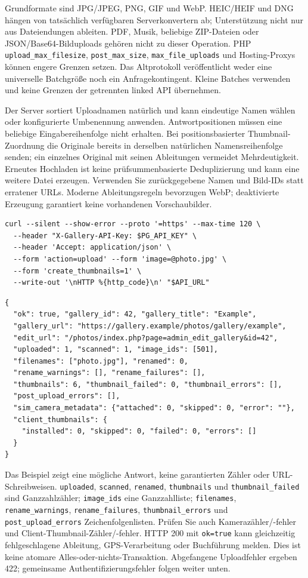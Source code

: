 \documentclass[11pt,a4paper]{article}
\newcommand{\codeword}[1]{\nolinkurl{#1}}
\begin{document}
Grundformate sind JPG/JPEG, PNG, GIF und WebP. HEIC/HEIF und DNG hängen von tatsächlich
verfügbaren Serverkonvertern ab; Unterstützung nicht nur aus Dateiendungen ableiten. PDF,
Musik, beliebige ZIP-Dateien oder JSON/Base64-Bilduploads gehören nicht zu dieser Operation.
PHP \codeword{upload_max_filesize}, \codeword{post_max_size}, \codeword{max_file_uploads}
und Hosting-Proxys können engere Grenzen setzen. Das Altprotokoll veröffentlicht weder eine
universelle Batchgröße noch ein Anfragekontingent. Kleine Batches verwenden und keine
Grenzen der getrennten linked API übernehmen.

Der Server sortiert Uploadnamen natürlich und kann eindeutige Namen wählen oder
konfigurierte Umbenennung anwenden. Antwortpositionen müssen eine beliebige
Eingabereihenfolge nicht erhalten. Bei positionsbasierter Thumbnail-Zuordnung die Originale
bereits in derselben natürlichen Namensreihenfolge senden; ein einzelnes Original mit seinen
Ableitungen vermeidet Mehrdeutigkeit. Erneutes Hochladen ist keine prüfsummenbasierte
Deduplizierung und kann eine weitere Datei erzeugen. Verwenden Sie zurückgegebene Namen und
Bild-IDs statt erratener URLs. Moderne Ableitungsregeln bevorzugen WebP; deaktivierte
Erzeugung garantiert keine vorhandenen Vorschaubilder.

\begin{lstlisting}[language={}]
curl --silent --show-error --proto '=https' --max-time 120 \
  --header "X-Gallery-API-Key: $PG_API_KEY" \
  --header 'Accept: application/json' \
  --form 'action=upload' --form 'image=@photo.jpg' \
  --form 'create_thumbnails=1' \
  --write-out '\nHTTP %{http_code}\n' "$API_URL"
\end{lstlisting}

\begin{lstlisting}[language={}]
{
  "ok": true, "gallery_id": 42, "gallery_title": "Example",
  "gallery_url": "https://gallery.example/photos/gallery/example",
  "edit_url": "/photos/index.php?page=admin_edit_gallery&id=42",
  "uploaded": 1, "scanned": 1, "image_ids": [501],
  "filenames": ["photo.jpg"], "renamed": 0,
  "rename_warnings": [], "rename_failures": [],
  "thumbnails": 6, "thumbnail_failed": 0, "thumbnail_errors": [],
  "post_upload_errors": [],
  "sim_camera_metadata": {"attached": 0, "skipped": 0, "error": ""},
  "client_thumbnails": {
    "installed": 0, "skipped": 0, "failed": 0, "errors": []
  }
}
\end{lstlisting}

Das Beispiel zeigt eine mögliche Antwort, keine garantierten Zähler oder URL-Schreibweisen.
\codeword{uploaded}, \codeword{scanned}, \codeword{renamed}, \codeword{thumbnails} und
\codeword{thumbnail_failed} sind Ganzzahlzähler; \codeword{image_ids} eine Ganzzahlliste;
\codeword{filenames}, \codeword{rename_warnings}, \codeword{rename_failures},
\codeword{thumbnail_errors} und \codeword{post_upload_errors} Zeichenfolgenlisten. Prüfen
Sie auch Kamerazähler/-fehler und Client-Thumbnail-Zähler/-fehler. HTTP 200 mit
\codeword{ok=true} kann gleichzeitig fehlgeschlagene Ableitung, GPS-Verarbeitung oder
Buchführung melden. Dies ist keine atomare Alles-oder-nichts-Transaktion. Abgefangene
Uploadfehler ergeben 422; gemeinsame Authentifizierungsfehler folgen weiter unten.
\end{document}

